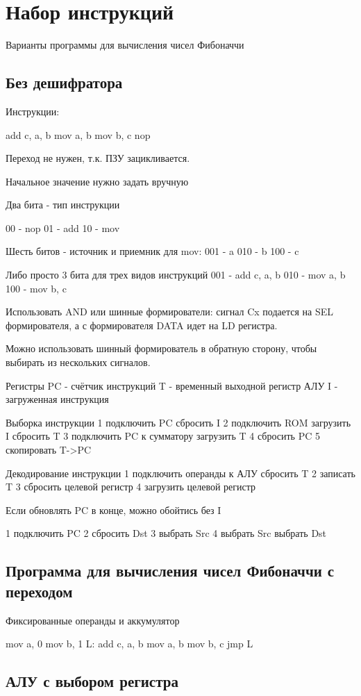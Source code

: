 \chapter{Набор инструкций}

Варианты программы для вычисления чисел Фибоначчи

\section{Без дешифратора}

Инструкции:

add c, a, b
mov a, b
mov b, c
nop

Переход не нужен, т.к. ПЗУ зацикливается.

Начальное значение нужно задать вручную

Два бита - тип инструкции

00 - nop
01 - add
10 - mov

Шесть битов - источник и приемник для mov:
001 - a
010 - b
100 - c

Либо просто 3 бита для трех видов инструкций
001 - add c, a, b
010 - mov a, b
100 - mov b, c


Использовать AND или шинные формирователи: сигнал Cx подается на SEL формирователя, а с формирователя DATA идет на LD регистра.

Можно использовать шинный формирователь в обратную сторону, чтобы выбирать из нескольких сигналов.

Регистры
 PC - счётчик инструкций
 T - временный выходной регистр АЛУ
 I - загруженная инструкция

Выборка инструкции
 1 подключить PC
   сбросить I
 2 подключить ROM
   загрузить I
   сбросить T
 3 подключить PC к сумматору
   загрузить T
 4 сбросить PC
 5 скопировать T->PC

Декодирование инструкции
 1 подключить операнды к АЛУ
   сбросить T
 2 записать T
 3 сбросить целевой регистр
 4 загрузить целевой регистр

Если обновлять PC в конце, можно обойтись без I

1 подключить PC
2 сбросить Dst
3 выбрать Src
4 выбрать Src
  выбрать Dst


\section{Программа для вычисления чисел Фибоначчи с переходом}

Фиксированные операнды и аккумулятор

mov a, 0
mov b, 1
L:
add c, a, b
mov a, b
mov b, c
jmp L

\section{АЛУ с выбором регистра}
